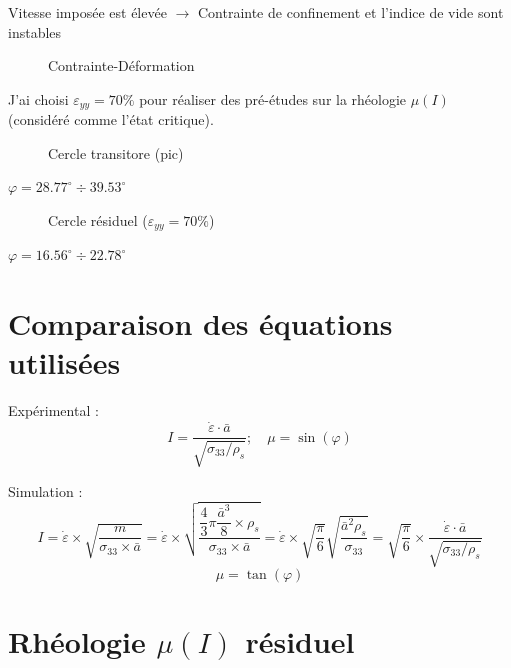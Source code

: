 \documentclass[a4paper,12pt]{report}
\begin{document}
\begin{table}
                                Vitesse imposée est élevée $\rightarrow$ Contrainte de confinement et l'indice de vide sont instables

     
                                \begin{figure}
                                    
                                    \caption{Contrainte-Déformation}
                                \end{figure}
                                J'ai choisi $\varepsilon_{yy} = 70\%$ pour réaliser des pré-études sur la rhéologie $\mu(I)$ (considéré comme l'état critique). 


                                \begin{figure}
                                  
                                    \caption{Cercle transitore (pic)}
                                \end{figure}

                                    $\varphi = 28.77^\circ \div 39.53^\circ $


                                \begin{figure}
                                    
                                    \caption{Cercle résiduel ($\varepsilon_{yy} = 70\%$)}
                                \end{figure}
                                    $\varphi = 16.56^\circ \div 22.78^\circ $
                                    
\section{Comparaison des équations utilisées}

Expérimental : 
\[
I =  \dfrac{\dot{\varepsilon} \cdot \bar{a}}{\sqrt{\sigma_{33}/\rho_s}}; \quad \mu = \sin(\varphi)
\]

Simulation : 
\[
I = \dot{\varepsilon} \times \sqrt {\dfrac{m}{\sigma_{33}\times \bar{a}}}  
= \dot{\varepsilon} \times \sqrt {\dfrac{\dfrac{4}{3} \pi \dfrac{\bar{a}^3}{8} \times \rho_s}{\sigma_{33}\times \bar{a}}} 
= \dot{\varepsilon} \times \sqrt{\dfrac{\pi}{6}} \sqrt {\dfrac{\bar{a}^2 \rho_s}{\sigma_{33}}} 
= \boxed{\sqrt{\dfrac{\pi}{6}}} \times \dfrac{\dot{\varepsilon} \cdot \bar{a}}{\sqrt{\sigma_{33}/\rho_s}}
\]
\[
\mu = \tan(\varphi)
\]

\section{Rhéologie $\mu(I)$ résiduel}


\end{table}
\end{document}
